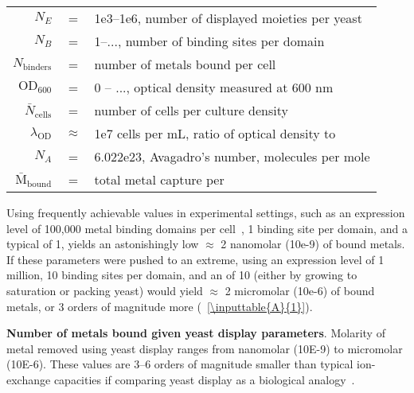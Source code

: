 \documentclass[../main/main]{subfiles}
\begin{document}
\begin{center}
	\begin{tabularx}{.75\textwidth}{r c X}
		$N_E$ & = & 1e3--1e6, number of displayed moieties per yeast \\
		$N_B$ & = & 1--..., number of binding sites per domain \\
		$N_{\text{binders}}$ & = & number of metals bound per cell \\
		$\text{OD}_{600}$ & = & 0 -- ..., optical density measured at 600 nm \\
		$\bar N_{\text{cells}}$ & = & number of cells per culture density \\
		$\lambda_{\text{OD}}$ & $\approx$ & 1e7 cells per mL, ratio of optical density to \OD{} \\
		$N_A$ & = & 6.022e23, Avagadro's number, molecules per mole \\
		$\bar{\text{M}}_\text{bound}$ & = & total metal capture per \OD{}
	\end{tabularx}
	\addtocounter{table}{-1}	%
\end{center}
\vspace{-\baselineskip}

Using frequently achievable values in experimental settings, such as an expression level of 100,000 metal binding domains per cell~\cite{kieke1999}, 1 binding site per domain, and a typical \OD{} of 1, yields an astonishingly low $\approx$ 2 nanomolar (10e-9) of bound metals. If these parameters were pushed to an extreme, using an expression level of 1 million, 10 binding sites per domain, and an \OD{} of 10 (either by growing to saturation or packing yeast) would yield $\approx$ 2 micromolar (10e-6) of bound metals, or 3 orders of magnitude more (\TABLE~\ref{\inputtable{A}{1}}).

\begin{table}[H]
	\centering
	
	\caption[Number of metals bound given yeast display parameters]
	{
		\textbf{Number of metals bound given yeast display parameters}.
		Molarity of metal removed using yeast display ranges from nanomolar (10E-9) to micromolar (10E-6). These values are 3--6 orders of magnitude smaller than typical ion-exchange capacities if comparing yeast display as a biological analogy~\cite{barakat2011new}.
	}
	\label{\inputtable{A}{1}}
\end{table}
\end{document}
